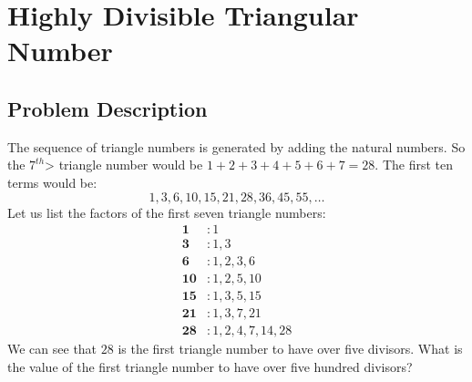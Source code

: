\chapter{Highly Divisible Triangular Number}
\section{Problem Description}
The sequence of triangle numbers is generated by adding the natural numbers. So the $7^{th}$> triangle number would be $1 + 2 + 3 + 4 + 5 + 6 + 7 = 28$. The first ten terms would be:
$$1, 3, 6, 10, 15, 21, 28, 36, 45, 55, \dots$$
Let us list the factors of the first seven triangle numbers:
\begin{align*}
	\mathbf 1   & \colon 1             \\
	\mathbf 3   & \colon 1,3           \\
	\mathbf 6   & \colon 1,2,3,6       \\
	\mathbf{10} & \colon 1,2,5,10      \\
	\mathbf{15} & \colon 1,3,5,15      \\
	\mathbf{21} & \colon 1,3,7,21      \\
	\mathbf{28} & \colon 1,2,4,7,14,28
\end{align*}
We can see that $28$ is the first triangle number to have over five divisors.
What is the value of the first triangle number to have over five hundred divisors?
